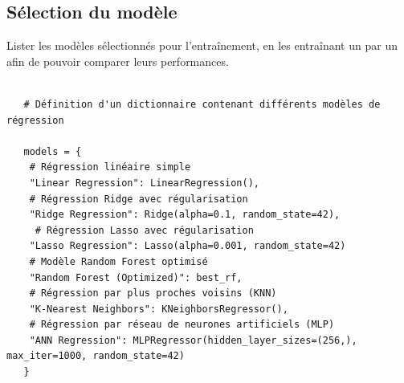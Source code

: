 \subsection{Sélection du modèle}
Lister les modèles sélectionnés pour l'entraînement, en les entraînant un par un afin de pouvoir comparer leurs performances.
\begin{verbatim}

   # Définition d'un dictionnaire contenant différents modèles de régression
   
   models = {
   	# Régression linéaire simple
   	"Linear Regression": LinearRegression(),
   	# Régression Ridge avec régularisation 
   	"Ridge Regression": Ridge(alpha=0.1, random_state=42),
   	 # Régression Lasso avec régularisation
   	"Lasso Regression": Lasso(alpha=0.001, random_state=42)
   	# Modèle Random Forest optimisé 
   	"Random Forest (Optimized)": best_rf,
   	# Régression par plus proches voisins (KNN)
   	"K-Nearest Neighbors": KNeighborsRegressor(),
   	# Régression par réseau de neurones artificiels (MLP)  
   	"ANN Regression": MLPRegressor(hidden_layer_sizes=(256,), max_iter=1000, random_state=42)  
   }
\end{verbatim}


